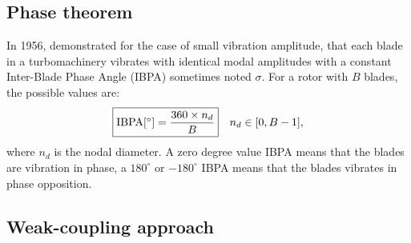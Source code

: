 \subsection{Phase theorem}
\label{sub:lane_theorem}

In 1956, \citet{Lane1956} 
demonstrated for the case of small vibration amplitude,
that each blade in a turbomachinery vibrates with
identical modal amplitudes with a constant Inter-Blade
Phase Angle (IBPA) sometimes noted $\sigma$. For a rotor with $B$ blades,
the possible values are:
\begin{equation}
    \fbox{$\textrm{IBPA} [^\circ] = \displaystyle \frac{360 \times n_d}{B}$} \quad n_d \in [0, B-1],
\end{equation}
where $n_d$ is the nodal diameter.
A zero degree value IBPA means that the blades are vibration in phase, a $180^\circ$ or
$-180^\circ$ IBPA means that the blades vibrates in phase opposition.

\subsection{Weak-coupling approach}
\label{sub:weak_coupling_approach}

